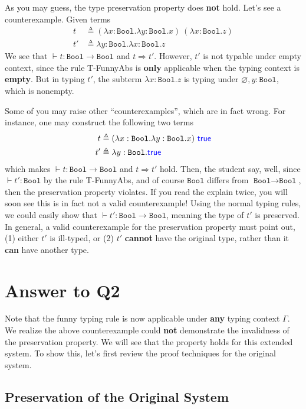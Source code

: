 \documentclass[11pt]{article}
\let\t\texttt
\let\emptyset\varnothing
\let\to\rightarrow
\let\reduce\Rightarrow
\let\defas\triangleq
\newcommand{\Bool}{\t{Bool}}
\newcommand{\kword}[1]{{\color{blue} \textsf{#1}}}
\newcommand{\True}{\kword{true}}
\begin{document}
As you may guess, the type preservation property does \textbf{not} hold. Let's see a counterexample.
Given terms
\begin{align*}
    t &\defas (\lambda x:\Bool.\lambda y:\Bool.x)~(\lambda x:\Bool.z) \\
    t' &\defas \lambda y:\Bool.\lambda x:\Bool.z
\end{align*}
We see that $\vdash t: \Bool\to\Bool$ and $t \reduce t'$.
However, $t'$ is not typable under empty context, since the rule T-FunnyAbs is \textbf{only} applicable when the typing context is \textbf{empty}.
But in typing $t'$, the subterm $\lambda x:\Bool.z$ is typing under $\emptyset,y:\Bool$, which is nonempty.

Some of you may raise other ``counterexamples'', which are in fact wrong.
For instance, one may construct the following two terms
\begin{align*}
    t &\defas (\lambda x:\Bool.\lambda y:\Bool.x)~\True \\
    t' &\defas \lambda y:\Bool.\True
\end{align*}
which makes $\vdash t: \Bool\to\Bool$ and $t \reduce t'$ hold.
Then, the student say, well, since $\vdash t': \Bool$ by the rule T-FunnyAbs, and of course $\Bool$ differs from $\Bool\to\Bool$, then the preservation property violates.
If you read the explain twice, you will soon see this is in fact not a valid counterexample!
Using the normal typing rules, we could easily show that $\vdash t': \Bool\to\Bool$, meaning the type of $t'$ is preserved.
In general, a valid counterexample for the preservation property must point out, (1) either $t'$ is ill-typed, or (2) $t'$ \textbf{cannot} have the original type, rather than it \textbf{can} have another type.

\section{Answer to Q2}

Note that the funny typing rule is now applicable under \textbf{any} typing context $\Gamma$.
We realize the above counterexample could \textbf{not} demonstrate the invalidness of the preservation property.
We will see that the property holds for this extended system.
To show this, let's first review the proof techniques for the original system.

\subsection{Preservation of the Original System}
\end{document}
